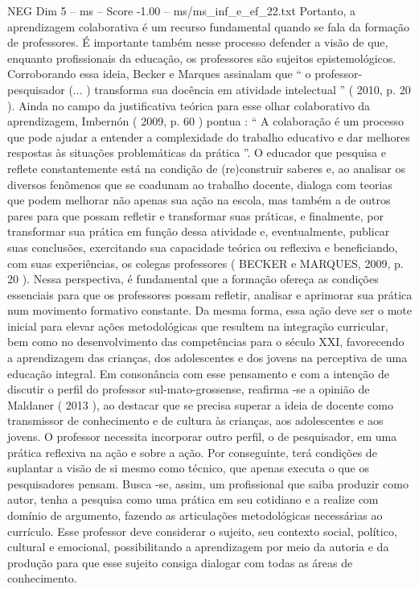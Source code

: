 \begin{textsample}{NEG Dim 5 – ms – Score -1.00 – ms/ms\_inf\_e\_ef\_22.txt}
Portanto, a aprendizagem colaborativa é um recurso fundamental quando se fala da formação de professores.
É importante também nesse processo defender a visão de que, enquanto profissionais da educação, os professores são sujeitos epistemológicos.
Corroborando essa ideia, Becker e Marques assinalam que “ o professor-pesquisador (... ) transforma sua docência em atividade intelectual ” ( 2010, p. 20 ).
Ainda no campo da justificativa teórica para esse olhar colaborativo da aprendizagem, Imbernón ( 2009, p. 60 ) pontua : “ A colaboração é um processo que pode ajudar a entender a complexidade do trabalho educativo e dar melhores respostas às situações problemáticas da prática ”.
O educador que pesquisa e reflete constantemente está na condição de (re)construir saberes e, ao analisar os diversos fenômenos que se coadunam ao trabalho docente, dialoga com teorias que podem melhorar não apenas sua ação na escola, mas também a de outros pares para que possam refletir e transformar suas práticas, e finalmente, por transformar sua prática em função dessa atividade e, eventualmente, publicar suas conclusões, exercitando sua capacidade teórica ou reflexiva e beneficiando, com suas experiências, os colegas professores ( BECKER e MARQUES, 2009, p. 20 ).
Nessa perspectiva, é fundamental que a formação ofereça as condições essenciais para que os professores possam refletir, analisar e aprimorar sua prática num movimento formativo constante.
Da mesma forma, essa ação deve ser o mote inicial para elevar ações metodológicas que resultem na integração curricular, bem como no desenvolvimento das competências para o século XXI, favorecendo a aprendizagem das crianças, dos adolescentes e dos jovens na perceptiva de uma educação integral.
Em consonância com esse pensamento e com a intenção de discutir o perfil do professor sul-mato-grossense, reafirma -se a opinião de Maldaner ( 2013 ), ao destacar que se precisa superar a ideia de docente como transmissor de conhecimento e de cultura às crianças, aos adolescentes e aos jovens.
O professor necessita incorporar outro perfil, o de pesquisador, em uma prática reflexiva na ação e sobre a ação.
Por conseguinte, terá condições de suplantar a visão de si mesmo como técnico, que apenas executa o que os pesquisadores pensam.
Busca -se, assim, um profissional que saiba produzir como autor, tenha a pesquisa como uma prática em seu cotidiano e a realize com domínio de argumento, fazendo as articulações metodológicas necessárias ao currículo.
Esse professor deve considerar o sujeito, seu contexto social, político, cultural e emocional, possibilitando a aprendizagem por meio da autoria e da produção para que esse sujeito consiga dialogar com todas as áreas de conhecimento.

\end{textsample}
